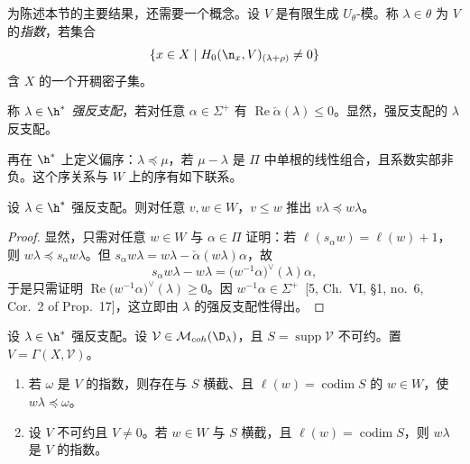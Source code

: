 为陈述本节的主要结果，还需要一个概念。设 $V$ 是有限生成 $U_\theta$-模。称 $\lambda\in\theta$ 为 $V$ 的\emph{指数}，若集合
$$\{x\in X\mid H_0(\n_x,V)_{(\lambda+\rho)}\ne 0\}$$
含 $X$ 的一个开稠密子集。

称 $\lambda\in\h^*$ \emph{强反支配}，若对任意 $\alpha\in\Sigma^+$ 有 $\operatorname{Re}\check{\alpha}(\lambda)\le 0$。显然，强反支配的 $\lambda$ 反支配。

再在 $\h^*$ 上定义偏序：$\lambda\preccurlyeq\mu$，若 $\mu-\lambda$ 是 $\Pi$ 中单根的线性组合，且系数实部非负。这个序关系与 $W$ 上的序有如下联系。

\begin{lemma}\label{lem:03.9.9}
设 $\lambda\in\h^*$ 强反支配。则对任意 $v,w\in W$，$v\le w$ 推出 $v\lambda\preccurlyeq w\lambda$。
\end{lemma}

\begin{proof}
显然，只需对任意 $w\in W$ 与 $\alpha\in\Pi$ 证明：若 $\ell(s_\alpha w)=\ell(w)+1$，则 $w\lambda\preccurlyeq s_\alpha w\lambda$。但 $s_\alpha w\lambda=w\lambda-\check{\alpha}(w\lambda)\alpha$，故
$$s_\alpha w\lambda-w\lambda=\bigl(w^{-1}\alpha\bigr)^{\vee}(\lambda)\alpha,$$
于是只需证明 $\operatorname{Re}\bigl(w^{-1}\alpha\bigr)^{\vee}(\lambda)\ge 0$。因 $w^{-1}\alpha\in\Sigma^+$~[5, Ch.~VI, \S1, no.~6, Cor.~2 of Prop.~17]，这立即由 $\lambda$ 的强反支配性得出。
\end{proof}

\begin{theorem}\label{thm:03.9.10}
设 $\lambda\in\h^*$ 强反支配。设 $\mathcal{V}\in\mathcal{M}_{coh}(\D_\lambda)$，且 $S=\operatorname{supp}\mathcal{V}$ 不可约。置 $V=\Gamma(X,\mathcal{V})$。
\begin{enumerate}[label=(\roman*)]
\item 若 $\omega$ 是 $V$ 的指数，则存在与 $S$ 横截、且 $\ell(w)=\operatorname{codim}S$ 的 $w\in W$，使 $w\lambda\preccurlyeq\omega$。
\item 设 $V$ 不可约且 $V\ne 0$。若 $w\in W$ 与 $S$ 横截，且 $\ell(w)=\operatorname{codim}S$，则 $w\lambda$ 是 $V$ 的指数。
\end{enumerate}
\end{theorem}

